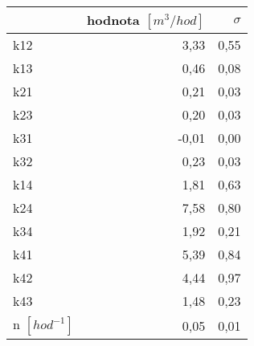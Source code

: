\begin{tabular}{lrr}
\toprule
{} &  hodnota $\left[\si{m^3/hod}\right]$ &  $\sigma$ \\
\midrule
k12                 &                                 3,33 &      0,55 \\
k13                 &                                 0,46 &      0,08 \\
k21                 &                                 0,21 &      0,03 \\
k23                 &                                 0,20 &      0,03 \\
k31                 &                                -0,01 &      0,00 \\
k32                 &                                 0,23 &      0,03 \\
k14                 &                                 1,81 &      0,63 \\
k24                 &                                 7,58 &      0,80 \\
k34                 &                                 1,92 &      0,21 \\
k41                 &                                 5,39 &      0,84 \\
k42                 &                                 4,44 &      0,97 \\
k43                 &                                 1,48 &      0,23 \\
n $[\si{hod^{-1}}]$ &                                 0,05 &      0,01 \\
\bottomrule
\end{tabular}
